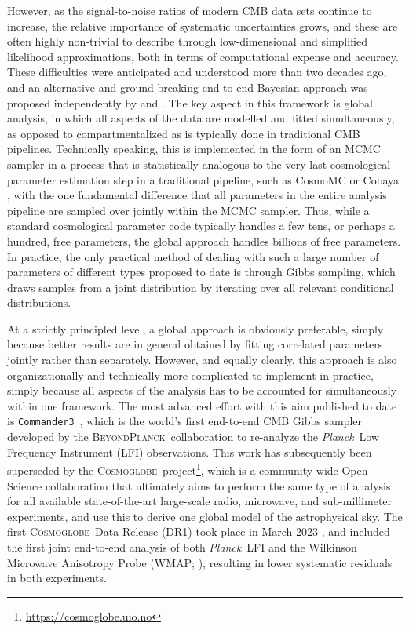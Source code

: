 \documentclass[twocolumn]{../common/aa}
\def\Planck{\emph{Planck}}
\def\commanderthree{\texttt{Commander3}}
\newcommand{\BP}{\textsc{BeyondPlanck}}
\newcommand{\cosmoglobe}{\textsc{Cosmoglobe}}
\begin{document}
However, as the signal-to-noise ratios of modern CMB data sets continue to increase, the relative importance of systematic uncertainties grows, and these are often highly non-trivial to describe through low-dimensional and simplified likelihood approximations, both in terms of computational expense and accuracy. These difficulties were anticipated and understood more than two decades ago, and an alternative and ground-breaking end-to-end Bayesian approach was proposed independently by \citet{jewell2004} and \citet{wandelt2004}. The key aspect in this framework is global analysis, in which all aspects of the data are modelled and fitted simultaneously, as opposed to compartmentalized as is typically done in traditional CMB pipelines. Technically speaking, this is implemented in the form of an MCMC sampler in a process that is statistically analogous to the very last cosmological parameter estimation step in a traditional pipeline, such as CosmoMC \citep{cosmomc} or Cobaya \citep{Torrado:2020dgo}, with the one fundamental difference that all parameters in the entire analysis pipeline are sampled over jointly within the MCMC sampler. Thus, while a standard cosmological parameter code typically handles a few tens, or perhaps a hundred, free parameters, the global approach handles billions of free parameters. In practice, the only practical method of dealing with such a large number of parameters of different types proposed to date is through Gibbs sampling, which draws samples from a joint distribution by iterating over all relevant conditional distributions.

At a strictly principled level, a global approach is obviously preferable, simply because better results are in general obtained by fitting correlated parameters jointly rather than separately. However, and equally clearly, this approach is also organizationally and technically more complicated to implement in practice, simply because all aspects of the analysis has to be accounted for simultaneously within one framework. The most advanced effort with this aim published to date is \commanderthree\ \citet{bp05}, which is the world's first end-to-end CMB Gibbs sampler developed by the \BP\ collaboration to re-analyze the \Planck\ Low Frequency Instrument (LFI) observations. This work has subsequently been superseded by the \cosmoglobe\ project\footnote{\url{https://cosmoglobe.uio.no}}, which is a community-wide Open Science collaboration that ultimately aims to perform the same type of analysis for all available state-of-the-art large-scale radio, microwave, and sub-millimeter experiments, and use this to derive one global model of the astrophysical sky. The first \cosmoglobe\ Data Release (DR1) took place in March 2023 \citep{watts2023_dr1}, and included the first joint end-to-end analysis of both \Planck\ LFI and the Wilkinson Microwave Anisotropy Probe (WMAP; \citealp{bennett2012}), resulting in lower systematic residuals in both experiments.
\end{document}
